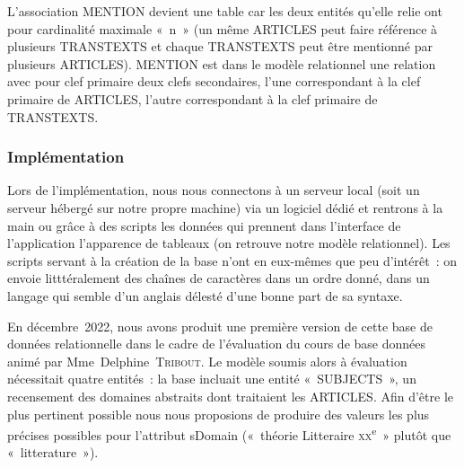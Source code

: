 L'association MENTION devient une table car les deux entités qu'elle relie ont pour cardinalité maximale «~n~» (un même ARTICLES peut faire référence à plusieurs TRANSTEXTS et chaque TRANSTEXTS peut être mentionné par plusieurs ARTICLES). MENTION est dans le modèle relationnel une relation avec pour clef primaire deux clefs secondaires, l'une correspondant à la clef primaire de ARTICLES, l'autre correspondant à la clef primaire de TRANSTEXTS.


\subsubsection{Implémentation}
    Lors de l'implémentation, nous nous connectons à un serveur local (soit un serveur hébergé sur notre propre machine) via un logiciel dédié et rentrons à la main ou grâce à des scripts les données qui prennent dans l'interface de l'application l'apparence de tableaux (on retrouve notre modèle relationnel). Les scripts servant à la création de la base n'ont en eux-mêmes que peu d'intérêt~: on envoie litttéralement des chaînes de caractères dans un ordre donné, dans un langage qui semble d'un anglais délesté d'une bonne part de sa syntaxe.

  En décembre~2022, nous avons produit une première version de cette base de données relationnelle dans le cadre de l'évaluation du cours de base données animé par Mme~Delphine~\textsc{Tribout}. Le modèle soumis alors à évaluation nécessitait quatre entités~: la base incluait une entité «~SUBJECTS~», un recensement des domaines abstraits dont traitaient les ARTICLES. Afin d'être le plus pertinent possible nous nous proposions de produire des valeurs les plus précises possibles pour l'attribut sDomain («~théorie Litteraire \textsc{xx}\textsuperscript{e}~» plutôt que «~litterature~»).

